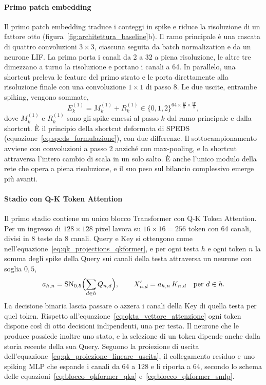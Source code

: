 \paragraph{Primo patch embedding}
\label{subsec:primo_embedding}
Il primo patch embedding traduce i conteggi in spike e riduce la risoluzione di un fattore otto (figura~\ref{fig:architettura_baseline}b). Il ramo principale è una cascata di quattro convoluzioni $3\times3$, ciascuna seguita da batch normalization e da un neurone LIF. La prima porta i canali da 2 a 32 a piena risoluzione, le altre tre dimezzano a turno la risoluzione e portano i canali a 64. In parallelo, una shortcut preleva le feature del primo strato e le porta direttamente alla risoluzione finale con una convoluzione $1\times1$ di passo 8. Le due uscite, entrambe spiking, vengono sommate,
\begin{equation}
\label{eq:primo_embedding}
E^{(1)}_k=M^{(1)}_k+R^{(1)}_k\in\{0,1,2\}^{64\times\frac H8\times\frac W8},
\end{equation}
dove $M^{(1)}_k$ e $R^{(1)}_k$ sono gli spike emessi al passo $k$ dal ramo principale e dalla shortcut. È il principio della shortcut deformata di SPEDS (equazione~\eqref{eq:speds_formulazione}), con due differenze. Il sottocampionamento avviene con convoluzioni a passo 2 anziché con max-pooling, e la shortcut attraversa l'intero cambio di scala in un solo salto. È anche l'unico modulo della rete che opera a piena risoluzione, e il suo peso sul bilancio complessivo emerge più avanti.

\paragraph{Stadio con Q-K Token Attention}
\label{subsec:stadio_qkta}
Il primo stadio contiene un unico blocco Transformer con Q-K Token Attention. Per un ingresso di $128\times128$ pixel lavora su $16\times16=256$ token con 64 canali, divisi in 8 teste da 8 canali. Query e Key si ottengono come nell'equazione~\eqref{eq:qk_projections_qkformer}, e per ogni testa $h$ e ogni token $n$ la somma degli spike della Query sui canali della testa attraversa un neurone con soglia $0{,}5$,
\begin{equation}
\label{eq:qkta_baseline}
a_{h,n}=\operatorname{SN}_{0{,}5}\Bigl(\sum_{d\in h}Q_{n,d}\Bigr),
\qquad
X'_{n,d}=a_{h,n}\,K_{n,d}\quad\text{per } d\in h.
\end{equation}
La decisione binaria lascia passare o azzera i canali della Key di quella testa per quel token. Rispetto all'equazione~\eqref{eq:qkta_vettore_attenzione} ogni token dispone così di otto decisioni indipendenti, una per testa. Il neurone che le produce possiede inoltre uno stato, e la selezione di un token dipende anche dalla storia recente della sua Query. Seguono la proiezione di uscita dell'equazione~\eqref{eq:qk_proiezione_lineare_uscita}, il collegamento residuo e uno spiking MLP che espande i canali da 64 a 128 e li riporta a 64, secondo lo schema delle equazioni~\eqref{eq:blocco_qkformer_qka} e~\eqref{eq:blocco_qkformer_smlp}.

